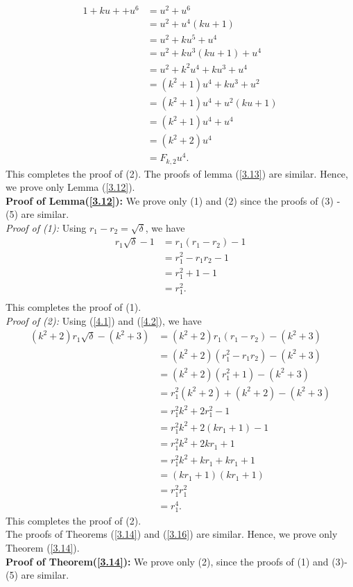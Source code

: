 \begin{align*}
1+ku++u^6&=u^2+u^6\\
&=u^2+u^4(ku+1)\\
&=u^2+ku^5+u^4\\
&=u^2+ku^3(ku+1)+u^4\\
&=u^2+k^2u^4+ku^3+u^4\\
&=(k^2+1)u^4+ku^3+u^2\\
&=(k^2+1)u^4+u^2(ku+1)\\
&=(k^2+1)u^4+u^4\\
&=(k^2+2)u^4\\
&=F_{k,2}u^4.
\end{align*}
This completes the proof of (2).
The proofs of lemma (\ref{3.13}) are similar. Hence, we prove only Lemma (\ref{3.12}).\\
\textbf{Proof of Lemma(\ref{3.12}):} We prove only (1) and (2) since the proofs of (3) - (5) are similar.\\
\textit{Proof of (1):}
Using $r_1-r_2=\sqrt{\delta}$, we have
\begin{align*}
r_1\sqrt{\delta}-1&=r_1(r_1-r_2)-1\\
&=r_1^2-r_1r_2-1\\
&=r_1^2+1-1\\
&=r_1^2.\\
\end{align*}
This completes the proof of (1).\\
\textit{Proof of (2):}
Using (\ref{4.1}) and (\ref{4.2}), we have
\begin{align*}
(k^2+2)r_1\sqrt{\delta}-(k^2+3)&=(k^2+2)r_1(r_1-r_2)-(k^2+3)\\
&=(k^2+2)(r_1^2-r_1r_2)-(k^2+3)\\
&=(k^2+2)(r_1^2+1)-(k^2+3)\\
&=r_1^2(k^2+2)+(k^2+2)-(k^2+3)\\
&=r_1^2k^2+2r_1^2-1\\
&=r_1^2k^2+2(kr_1+1)-1\\
&=r_1^2k^2+2kr_1+1\\
&=r_1^2k^2+kr_1+kr_1+1\\
&=(kr_1+1)(kr_1+1)\\
&=r_1^2r_1^2\\
&=r_1^4.
\end{align*}
This completes the proof of (2).\\
The proofs of Theorems (\ref{3.14}) and (\ref{3.16}) are similar. Hence, we prove only Theorem (\ref{3.14}).\\
\textbf{Proof of Theorem(\ref{3.14}):} We prove only (2), since the proofs of (1) and (3)-(5) are similar.\\
